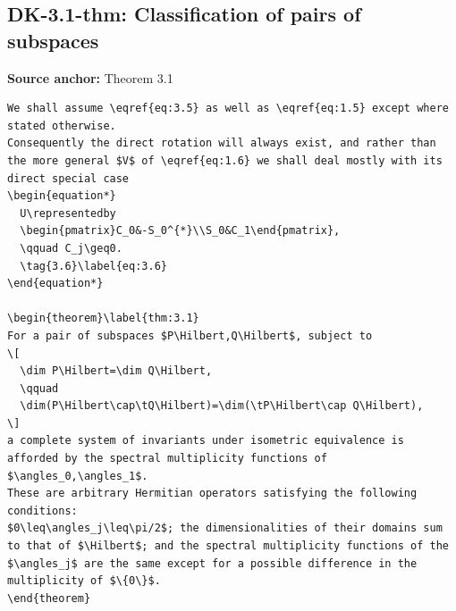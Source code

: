 \subsection*{DK-3.1-thm: Classification of pairs of subspaces}
\noindent\textbf{Source anchor:} Theorem 3.1\\
\begin{verbatim}
We shall assume \eqref{eq:3.5} as well as \eqref{eq:1.5} except where stated otherwise.
Consequently the direct rotation will always exist, and rather than the more general $V$ of \eqref{eq:1.6} we shall deal mostly with its direct special case
\begin{equation*}
  U\representedby
  \begin{pmatrix}C_0&-S_0^{*}\\S_0&C_1\end{pmatrix},
  \qquad C_j\geq0.
  \tag{3.6}\label{eq:3.6}
\end{equation*}

\begin{theorem}\label{thm:3.1}
For a pair of subspaces $P\Hilbert,Q\Hilbert$, subject to
\[
  \dim P\Hilbert=\dim Q\Hilbert,
  \qquad
  \dim(P\Hilbert\cap\tQ\Hilbert)=\dim(\tP\Hilbert\cap Q\Hilbert),
\]
a complete system of invariants under isometric equivalence is afforded by the spectral multiplicity functions of $\angles_0,\angles_1$.
These are arbitrary Hermitian operators satisfying the following conditions:
$0\leq\angles_j\leq\pi/2$; the dimensionalities of their domains sum to that of $\Hilbert$; and the spectral multiplicity functions of the $\angles_j$ are the same except for a possible difference in the multiplicity of $\{0\}$.
\end{theorem}
\end{verbatim}

